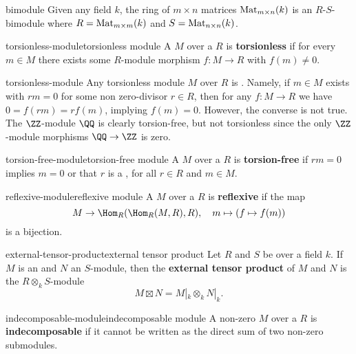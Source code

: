 \begin{example}{bimodule}
    Given any field $k$, the ring of $m \times n$ matrices $\textup{Mat}_{m \times n}(k)$ is an $R$-$S$-bimodule where $R = \textup{Mat}_{m \times m}(k)$ and $S = \textup{Mat}_{n \times n}(k)$.
\end{example}

\begin{topic}{torsionless-module}{torsionless module}
    A  $M$ over a  $R$ is \textbf{torsionless} if for every $m \in M$ there exists some $R$-module morphism $f : M \to R$ with $f(m) \ne 0$.
\end{topic}

\begin{example}{torsionless-module}
    Any torsionless module $M$ over $R$ is . Namely, if $m \in M$ exists with $rm = 0$ for some non zero-divisor $r \in R$, then for any $f : M \to R$ we have $0 = f(rm) = rf(m)$, implying $f(m) = 0$. However, the converse is not true. The $\ZZ$-module $\QQ$ is clearly torsion-free, but not torsionless since the only $\ZZ$-module morphisms $\QQ \to \ZZ$ is zero.
\end{example}

\begin{topic}{torsion-free-module}{torsion-free module}
    A  $M$ over a  $R$ is \textbf{torsion-free} if $rm = 0$ implies $m = 0$ or that $r$ is a , for all $r \in R$ and $m \in M$.
\end{topic}

\begin{topic}{reflexive-module}{reflexive module}
    A  $M$ over a  $R$ is \textbf{reflexive} if the map
    \[ M \to \Hom_R(\Hom_R(M, R), R), \quad m \mapsto (f \mapsto f(m)) \]
    is a bijection.
\end{topic}

\begin{topic}{external-tensor-product}{external tensor product}
    Let $R$ and $S$ be  over a field $k$. If $M$ is an  and $N$ an $S$-module, then the \textbf{external tensor product} of $M$ and $N$ is the $R \otimes_k S$-module
    \[ M \boxtimes N = M|_k \otimes_k N|_k . \]
\end{topic}

\begin{topic}{indecomposable-module}{indecomposable module}
    A non-zero  $M$ over a  $R$ is \textbf{indecomposable} if it cannot be written as the direct sum of two non-zero submodules.
\end{topic}

